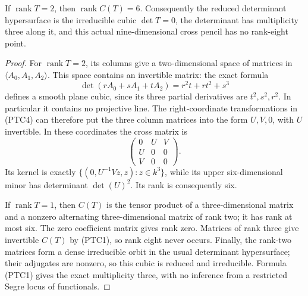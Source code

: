 \begin{proposition}
\label{prop:ss-product-one-axis-cross-corank-three}
If \(\operatorname{rank}T=2\), then \(\operatorname{rank}C(T)=6\).
Consequently the reduced determinant hypersurface is the irreducible
cubic \(\det T=0\), the determinant has multiplicity three along it,
and this actual nine-dimensional cross pencil has no rank-eight point.
\end{proposition}
\begin{proof}
For \(\operatorname{rank}T=2\), its columns give a two-dimensional
space of matrices in \(\langle A_0,A_1,A_2\rangle\).
This space contains an invertible matrix: the exact formula
\[
 \det(rA_0+sA_1+tA_2)=r^2t+rt^2+s^3
 \tag{PTC5}
\]
defines a smooth plane cubic, since its three partial derivatives
are \(t^2,s^2,r^2\). In particular it contains no projective line.
The right-coordinate transformations in (PTC4) can therefore
put the three column matrices into the form \(U,V,0\), with
\(U\) invertible. In these coordinates the cross matrix is
\[
                    \begin{pmatrix}0&U&V\\U&0&0\\V&0&0\end{pmatrix}.
 \tag{PTC6}
\]
Its kernel is exactly
\(\{(0,U^{-1}Vz,z):z\in k^3\}\), while its upper
six-dimensional minor has determinant \(\det(U)^2\).
Its rank is consequently six.

If \(\operatorname{rank}T=1\), then \(C(T)\) is the tensor
product of a three-dimensional matrix and a nonzero alternating
three-dimensional matrix of rank two; it has rank at most six.
The zero coefficient matrix gives rank zero. Matrices of rank three
give invertible \(C(T)\) by (PTC1), so rank eight never occurs.
Finally, the rank-two matrices form a dense irreducible orbit in
the usual determinant hypersurface; their adjugates are nonzero,
so this cubic is reduced and irreducible. Formula (PTC1) gives
the exact multiplicity three, with no inference from a restricted
Segre locus of functionals.
\end{proof}

